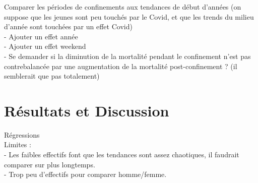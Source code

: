 \documentclass{article}
\begin{document}
Comparer les périodes de confinements aux tendances de début d'années (on suppose que les jeunes sont peu touchés par le Covid, et que les trends du milieu d'année sont touchées par un effet Covid)\\

- Ajouter un effet année \\

- Ajouter un effet weekend \\

- Se demander si la diminution de la mortalité pendant le confinement n'est pas contrebalancée par une augmentation de la mortalité post-confinement ? (il semblerait que pas totalement)\\





\section{Résultats et Discussion}

Régressions \\


Limites : \\

- Les faibles effectifs font que les tendances sont assez chaotiques, il faudrait comparer sur plus longtemps. \\

- Trop peu d'effectifs pour comparer homme/femme. \\
\end{document}
